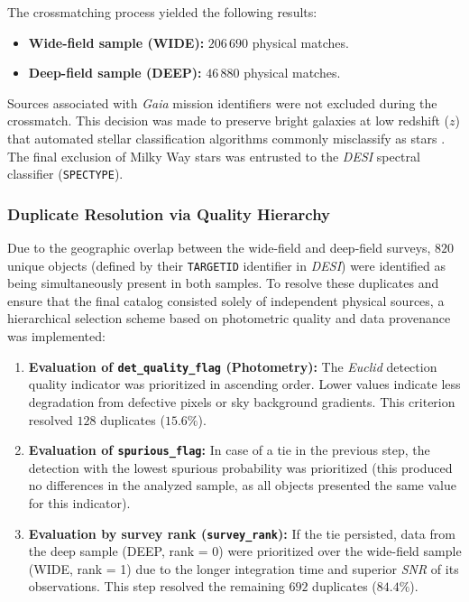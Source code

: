 The crossmatching process yielded the following results:

\begin{itemize}
\item \textbf{Wide-field sample (WIDE):} $206\,690$ physical matches.
\item \textbf{Deep-field sample (DEEP):} $46\,880$ physical matches.
\end{itemize}

Sources associated with \textit{Gaia} mission identifiers were not excluded during the crossmatch. This decision was made to preserve bright galaxies at low redshift ($z$) that automated stellar classification algorithms commonly misclassify as stars \autocite{ar:ecker-2026}. The final exclusion of Milky Way stars was entrusted to the \textit{\gls{DESI}} spectral classifier (\texttt{SPECTYPE}).

\subsubsection{Duplicate Resolution via Quality Hierarchy}

Due to the geographic overlap between the wide-field and deep-field surveys, $820$ unique objects (defined by their \texttt{TARGETID} identifier in \textit{\gls{DESI}}) were identified as being simultaneously present in both samples. To resolve these duplicates and ensure that the final catalog consisted solely of independent physical sources, a hierarchical selection scheme based on photometric quality and data provenance was implemented:

\begin{enumerate}
\item \textbf{Evaluation of \texttt{det\_quality\_flag} (Photometry):} The \textit{Euclid} detection quality indicator was prioritized in ascending order. Lower values indicate less degradation from defective pixels or sky background gradients. This criterion resolved $128$ duplicates ($15.6\%$).
\item \textbf{Evaluation of \texttt{spurious\_flag}:} In case of a tie in the previous step, the detection with the lowest spurious probability was prioritized (this produced no differences in the analyzed sample, as all objects presented the same value for this indicator).
\item \textbf{Evaluation by survey rank (\texttt{survey\_rank}):} If the tie persisted, data from the deep sample (DEEP, rank = 0) were prioritized over the wide-field sample (WIDE, rank = 1) due to the longer integration time and superior \textit{\gls{SNR}} of its observations. This step resolved the remaining $692$ duplicates ($84.4\%$).
\end{enumerate}

